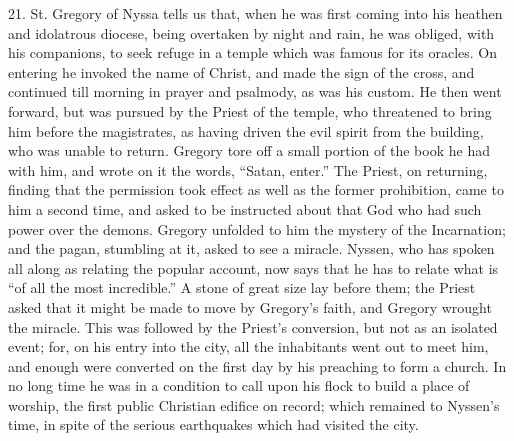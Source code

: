 21.
St. Gregory of Nyssa tells us that, when he was first coming into his
heathen and idolatrous diocese, being overtaken by night and rain, he
was obliged, with his companions, to seek refuge in a temple
which was famous for its oracles. On entering he invoked the name of
Christ, and made the sign of the cross, and continued till morning in
prayer and psalmody, as was his custom. He then went forward, but was
pursued by the Priest of the temple, who threatened to bring him
before the magistrates, as having driven the evil spirit from the
building, who was unable to return. Gregory tore off a small portion
of the book he had with him, and wrote on it the words, ``Satan, enter.''
The Priest, on returning, finding that the permission took effect as
well as the former prohibition, came to him a second time, and asked
to be instructed about that God who had such power over the demons.
Gregory unfolded to him the mystery of the Incarnation; and the pagan,
stumbling at it, asked to see a miracle. Nyssen, who has spoken all
along as relating the popular account, now says that he has to relate
what is ``of all the most incredible.'' A stone of great size lay before
them; the Priest asked that it might be made to move by Gregory's
faith, and Gregory wrought the miracle. This was followed by the
Priest's conversion, but not as an isolated event; for, on his entry
into the city, all the inhabitants went out to meet him, and enough
were converted on the first day by his preaching to form a church. In
no long time he was in a condition to call upon his flock to build a
place of worship, the first public Christian edifice on record;
which remained to Nyssen's time, in spite of the serious earthquakes
which had visited the city.


